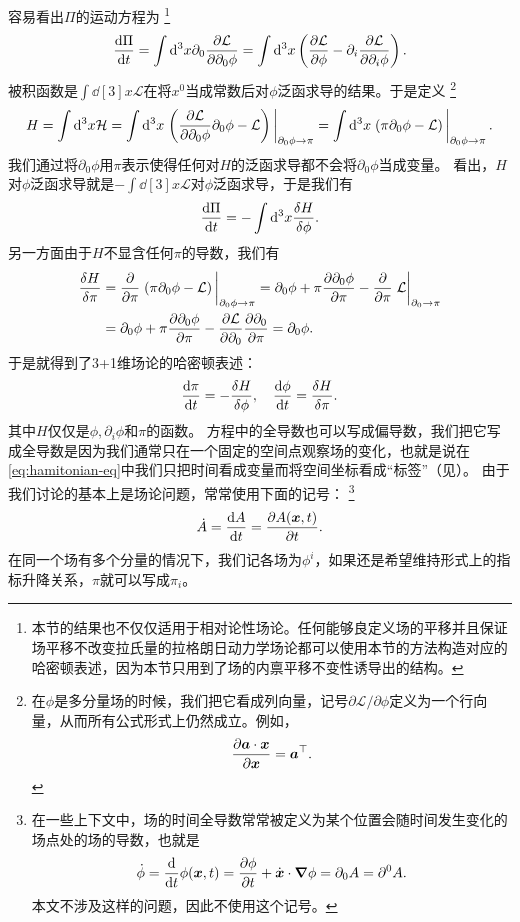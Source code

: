 \documentclass[hyperref, UTF8, a4paper]{ctexart}
\renewcommand{\autoref}{\prettyref}
\begin{document}
容易看出$\Pi$的运动方程为%
\footnote{本节的结果也不仅仅适用于相对论性场论。任何能够良定义场的平移并且保证场平移不改变拉氏量的拉格朗日动力学场论都可以使用本节的方法构造对应的哈密顿表述，因为本节只用到了场的内禀平移不变性诱导出的结构。}
\[
    \dv{\Pi}{t} = \int \dd[3]x \partial_0 \pdv{\mathcal{L}}{\partial_0 \phi} = \int \dd[3]x \left( \pdv{\mathcal{L}}{\phi} - \partial_i \pdv{\mathcal{L}}{\partial_i \phi} \right).
\]
被积函数是$\int \dd[3]x \mathcal{L}$在将$x^0$当成常数后对$\phi$泛函求导的结果。于是定义%
\footnote{在$\phi$是多分量场的时候，我们把它看成列向量，记号$\partial \mathcal{L} / \partial \phi$定义为一个行向量，从而所有公式形式上仍然成立。例如，
\[
    \pdv{\vb*{a} \cdot \vb*{x}}{\vb*{x}} = \vb*{a}^\top.
\]
}%
\begin{equation}
    H = \int \dd[3]x \mathcal{H} 
    = \int \dd[3]x \eval{\left( \pdv{\mathcal{L}}{\partial_0 \phi} \partial_0 \phi - \mathcal{L} \right)}_{\partial_0 \phi \to \pi} 
    = \int \dd[3]x \eval{\left( \pi \partial_0 \phi - \mathcal{L} \right)}_{\partial_0 \phi \to \pi}.
    \label{eq:lagrangian-to-hamitonian}
\end{equation}
我们通过将$\partial_0 \phi$用$\pi$表示使得任何对$H$的泛函求导都不会将$\partial_0 \phi$当成变量。
看出，$H$对$\phi$泛函求导就是$-\int \dd[3]x \mathcal{L}$对$\phi$泛函求导，于是我们有
\[
    \dv{\Pi}{t} = - \int \dd[3]x \fdv{H}{\phi}.
\]
另一方面由于$H$不显含任何$\pi$的导数，我们有
\[
    \begin{aligned}
        \fdv{H}{\pi} &= \pdv{\pi} \eval{\left( \pi \partial_0 \phi - \mathcal{L} \right)}_{\partial_0 \phi \to \pi} 
        = \partial_0 \phi + \pi \pdv{\partial_0 \phi}{\pi} - \pdv{\pi} \eval{\mathcal{L}}_{\partial_0 \to \pi} \\
        &= \partial_0 \phi + \pi \pdv{\partial_0 \phi}{\pi} - \pdv{\mathcal{L}}{\partial_0} \pdv{\partial_0}{\pi} = \partial_0 \phi.
    \end{aligned}
\]
于是就得到了3+1维场论的哈密顿表述：
\begin{equation}
    \dv{\pi}{t} = - \fdv{H}{\phi}, \quad \dv{\phi}{t} = \fdv{H}{\pi}.
    \label{eq:hamitonian-eq}
\end{equation}
其中$H$仅仅是$\phi, \partial_i \phi$和$\pi$的函数。
方程中的全导数也可以写成偏导数，我们把它写成全导数是因为我们通常只在一个固定的空间点观察场的变化，也就是说在\eqref{eq:hamitonian-eq}中我们只把时间看成变量而将空间坐标看成“标签”（见\autoref{note:spacial-label}）。
由于我们讨论的基本上是场论问题，常常使用下面的记号：%
\footnote{在一些上下文中，场的时间全导数常常被定义为某个位置会随时间发生变化的场点处的场的导数，也就是
\[
    \dot{\phi} = \dv{t} \phi(\vb*{x}, t) = \pdv{\phi}{t} + \dot{\vb*{x}} \cdot \grad{\phi} = \partial_0 A = \partial^0 A.
\]
本文不涉及这样的问题，因此不使用这个记号。
}%
\[
    \dot{A} = \dv{A}{t} = \pdv{A(\vb*{x}, t)}{t}.
\]
在同一个场有多个分量的情况下，我们记各场为$\phi^i$，如果还是希望维持形式上的指标升降关系，$\pi$就可以写成$\pi_i$。
\end{document}
